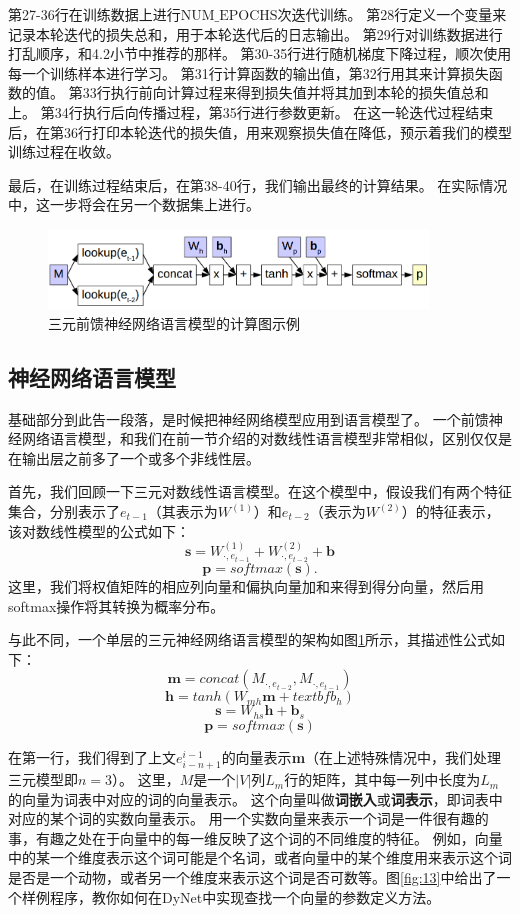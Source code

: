 \documentclass[10pt,a4paper]{ctexart}
\begin{document}
第27-36行在训练数据上进行$\mathrm{NUM\_EPOCHS}$次迭代训练。
第28行定义一个变量来记录本轮迭代的损失总和，用于本轮迭代后的日志输出。
第29行对训练数据进行打乱顺序，和4.2小节中推荐的那样。
第30-35行进行随机梯度下降过程，顺次使用每一个训练样本进行学习。
第31行计算函数的输出值，第32行用其来计算损失函数的值。
第33行执行前向计算过程来得到损失值并将其加到本轮的损失值总和上。
第34行执行后向传播过程，第35行进行参数更新。
在这一轮迭代过程结束后，在第36行打印本轮迭代的损失值，用来观察损失值在降低，预示着我们的模型训练过程在收敛。

最后，在训练过程结束后，在第38-40行，我们输出最终的计算结果。
在实际情况中，这一步将会在另一个数据集上进行。

\begin{figure}[H]
\centering
\includegraphics[width=0.9\textwidth]{fig12.png}
\caption{三元前馈神经网络语言模型的计算图示例}
\label{fig:12}
\end{figure}

\subsection{神经网络语言模型}
基础部分到此告一段落，是时候把神经网络模型应用到语言模型\cite{nakamura1990neural,bengio2003neural}了。
一个前馈神经网络语言模型，和我们在前一节介绍的对数线性语言模型非常相似，区别仅仅是在输出层之前多了一个或多个非线性层。

首先，我们回顾一下三元对数线性语言模型。在这个模型中，假设我们有两个特征集合，分别表示了$e_{t-1}$（其表示为$W^{(1)}$）和$e_{t-2}$（表示为$W^{(2)}$）的特征表示，该对数线性模型的公式如下：
\[
 \textbf{s} = W_{\cdot,e_{t-1}}^{(1)} + W_{\cdot,e_{t-2}}^{(2)} + \textbf{b}
\]
\[
 \textbf{p} = softmax( \textbf{s} ).
\]
这里，我们将权值矩阵的相应列向量和偏执向量加和来得到得分向量，然后用softmax操作将其转换为概率分布。

与此不同，一个单层的三元神经网络语言模型的架构如图\ref{fig:12}所示，其描述性公式如下：
\[
 \textbf{m} = concat(M_{\cdot,e_{t-2}},M_{\cdot,e_{t-1}})
\]
\[
 \textbf{h} = tanh( W_{mh}\textbf{m} + textbf{b}_h)
\]
\[
 \textbf{s} = W_{hs}\textbf{h} + \textbf{b}_s
\]
\[
 \textbf{p} = softmax(\textbf{s})
\]

在第一行，我们得到了上文$e_{i-n+1}^{i-1}$的向量表示\textbf{m}（在上述特殊情况中，我们处理三元模型即$n=3$）。
这里，$M$是一个$|V|$列$L_m$行的矩阵，其中每一列中长度为$L_m$的向量为词表中对应的词的向量表示。
这个向量叫做\textbf{词嵌入}或\textbf{词表示}，即词表中对应的某个词的实数向量表示。
用一个实数向量来表示一个词是一件很有趣的事，有趣之处在于向量中的每一维反映了这个词的不同维度的特征。
例如，向量中的某一个维度表示这个词可能是个名词，或者向量中的某个维度用来表示这个词是否是一个动物，或者另一个维度来表示这个词是否可数等。图\ref{fig:13}中给出了一个样例程序，教你如何在DyNet中实现查找一个向量的参数定义方法。
\end{document}
